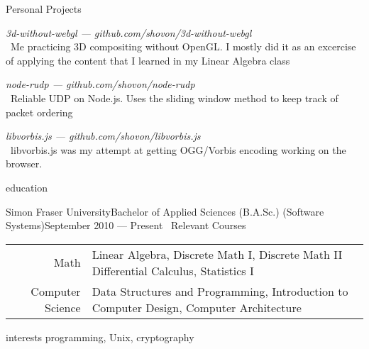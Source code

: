   \begin{cvsection}{Personal Projects}
    \vspace{-30pt}
    \begin{itemize}
      \vspace{-5pt}
      \begin{item}\textit{3d-without-webgl --- github.com/shovon/3d-without-webgl}\\ \ Me practicing 3D compositing without OpenGL. I mostly did it as an excercise of applying the content that I learned in my Linear Algebra class\end{item}
      \vspace{-5pt}
      \begin{item}\textit{node-rudp --- github.com/shovon/node-rudp}\\ \ Reliable UDP on Node.js. Uses the sliding window method to keep track of packet ordering\end{item}
      \vspace{-5pt}
      \begin{item}\textit{libvorbis.js --- github.com/shovon/libvorbis.js}\\ \ libvorbis.js was my attempt at getting OGG/Vorbis encoding working on the browser.\end{item}
    \end{itemize}
  \end{cvsection}

  \begin{cvsection}{education}
    \vspace{-10pt}
    \begin{cvedentry}{Simon Fraser University}{Bachelor of Applied Sciences (B.A.Sc.) (Software Systems)}{September 2010 --- Present}
      \vspace{10pt}
      \ Relevant Courses\\
      \begin{tabular}{ r p{12cm} }
        Math & Linear Algebra, Discrete Math I, Discrete Math II Differential \mbox{Calculus}, Statistics I\\
        Computer Science & Data Structures and Programming, Introduction to Computer Design, Computer Architecture\\
      \end{tabular}
    \end{cvedentry}
  \end{cvsection}

  \begin{cvsection}{interests}
    programming, Unix, cryptography
  \end{cvsection}


